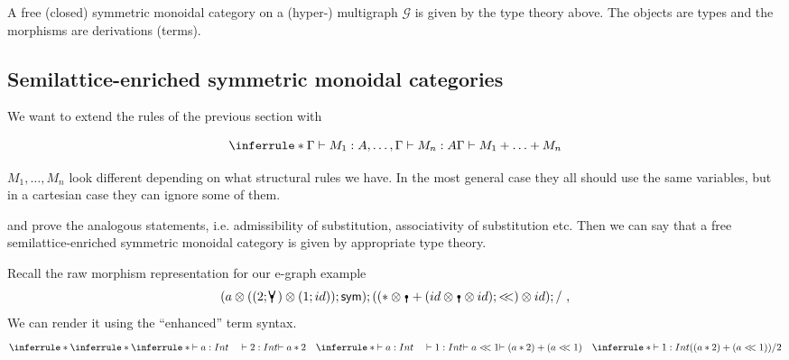 \documentclass[acmsmall,screen, nonacm, anonymous]{acmart}
\begin{document}
\begin{proposition}
  A free (closed) symmetric monoidal category on a (hyper-) multigraph $\mathcal{G}$ is given by the type theory above.
  The objects are types and the morphisms are derivations (terms).
\end{proposition}

\subsection{Semilattice-enriched symmetric monoidal categories}

We want to extend the rules of the previous section with

\[
\inferrule*{\Gamma \vdash M_1 : A, \ldots, \Gamma \vdash M_n : A}{
  \Gamma \vdash M_1 + \ldots + M_n
}
\]

$M_1, \ldots, M_n$ look different depending on what structural rules we have.
In the most general case they all should use the same variables, but in a cartesian case they can ignore some of them.

and prove the analogous statements, i.e. admissibility of substitution, associativity of substitution etc.
Then we can say that a free semilattice-enriched symmetric monoidal category is given by appropriate type theory.

\begin{example}
  Recall the raw morphism representation for our e-graph example
  \[(a \otimes ((2;\comonoid) \otimes (1;id));\sym);((* \otimes \counit + (id \otimes \counit \otimes id);<\!\!<) \otimes id);/~,\]
  We can render it using the  \enquote{enhanced} term syntax.
  \[
  \inferrule*{
  \inferrule*{
  \inferrule*{\vdash a : Int \quad \vdash 2 : Int}{\vdash a * 2}
  \quad
  \inferrule*{\vdash a : Int \quad \vdash 1 : Int}{\vdash a <\!\!< 1}
  }{\vdash (a * 2) + (a <\!\!< 1)}
  \quad
  \inferrule*{}{\vdash 1 : Int}
  }
  {((a * 2) + (a <\!\!< 1)) / 2}
  \]
\end{example}



\end{document}
